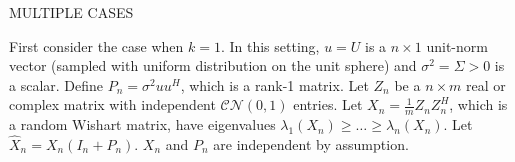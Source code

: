 
MULTIPLE CASES


First consider the case when $k=1$. In this setting, $u=U$ is a $n\times 1$ unit-norm vector (sampled with uniform distribution on the unit sphere) and $\sigma^2=\Sigma > 0$ is a scalar. Define $P_n=\sigma^2uu^H$, which is a rank-1 matrix. Let $Z_n$ be a $n\times m$ real or complex matrix with independent $\mathcal{CN}(0,1)$ entries. Let $X_n=\frac{1}{m}Z_nZ_n^H$, which is a random Wishart matrix, have eigenvalues $\lambda_1\left(X_n\right)\geq\dots\geq\lambda_n\left(X_n\right)$. Let $\widehat{X}_n=X_n\left(I_n+P_n\right)$. $X_n$ and $P_n$ are independent by assumption. %

